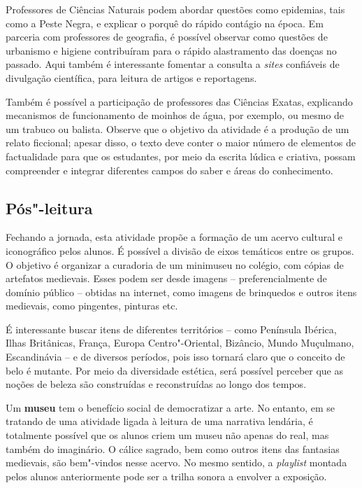 \documentclass{extarticle}
\begin{document}
Professores de Ciências Naturais podem abordar questões como epidemias,
tais como a Peste Negra, e explicar o porquê do rápido contágio na
época. Em parceria com professores de geografia, é possível observar
como questões de urbanismo e higiene contribuíram para o rápido
alastramento das doenças no passado. Aqui também é interessante fomentar
a consulta a \emph{sites} confiáveis de divulgação científica, para
leitura de artigos e reportagens.

Também é possível a participação de professores das Ciências Exatas,
explicando mecanismos de funcionamento de moinhos de água, por exemplo,
ou mesmo de um trabuco ou balista. Observe que o objetivo da atividade é
a produção de um relato ficcional; apesar disso, o texto deve conter o
maior número de elementos de factualidade para que os estudantes, por
meio da escrita lúdica e criativa, possam compreender e integrar
diferentes campos do saber e áreas do conhecimento.

\subsection{Pós"-leitura}

Fechando a jornada, esta atividade propõe a formação de um
acervo cultural e iconográfico pelos alunos. É possível a divisão de
eixos temáticos entre os grupos. O objetivo é organizar a curadoria de
um minimuseu no colégio, com cópias de artefatos medievais. Esses podem
ser desde imagens -- preferencialmente de domínio público -- obtidas na
internet, como imagens de brinquedos e outros itens medievais, como
pingentes, pinturas etc.

É interessante buscar itens de diferentes territórios -- como Península
Ibérica, Ilhas Britânicas, França, Europa Centro"-Oriental, Bizâncio,
Mundo Muçulmano, Escandinávia -- e de diversos períodos, pois isso
tornará claro que o conceito de belo é mutante. Por meio da diversidade
estética, será possível perceber que as noções de beleza são construídas
e reconstruídas ao longo dos tempos.

Um \textbf{museu} tem o benefício social de democratizar a arte. No
entanto, em se tratando de uma atividade ligada à leitura de uma
narrativa lendária, é totalmente possível que os alunos criem um museu
não apenas do real, mas também do imaginário. O cálice sagrado, bem como
outros itens das fantasias medievais, são bem"-vindos nesse acervo. No
mesmo sentido, a \emph{playlist} montada pelos alunos anteriormente pode
ser a trilha sonora a envolver a exposição.
\end{document}
